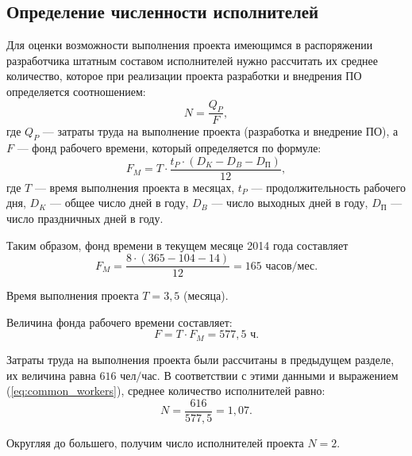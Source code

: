 \subsection{Определение численности исполнителей} \label{workers}

Для оценки возможности выполнения проекта имеющимся в распоряжении разработчика штатным составом исполнителей нужно рассчитать их среднее количество, которое при реализации проекта разработки и внедрения ПО определяется соотношением:
\begin{equation}
  \label{eq:common_workers}
N = \frac {Q_P} {F},
\end{equation}
где $Q_P$ --- затраты труда на выполнение проекта (разработка и внедрение ПО), а $F$ --- фонд рабочего времени, который определяется по формуле:
\begin{equation}
  \label{eq:time_fund_month_common}
F_M = T \cdot \frac {t_P \cdot (D_K - D_B - D_\textrm{П})} {12},
\end{equation}
где $T$ --- время выполнения проекта в месяцах, $t_P$ --- продолжительность рабочего дня, $D_K$ --- общее число дней в году, $D_B$ --- число выходных дней в году, $D_\textrm{П}$ --- число праздничных дней в году.

\vspace{\baselineskip}
Таким образом, фонд времени в текущем месяце 2014 года составляет
\begin{equation}
  \label{eq:time_fund_month}
F_M = \frac {8 \cdot (365 - 104 - 14)} {12} = 165 \textrm{ часов/мес}.
\end{equation}

Время выполнения проекта $T = 3,5$ (месяца).

\vspace{\baselineskip}
Величина фонда рабочего времени составляет:
\begin{equation}
  \label{eq:time_fund}
F = T \cdot F_M = 577,5 \textrm{ ч}.
\end{equation}

Затраты труда на выполнения проекта были рассчитаны в предыдущем разделе, их величина равна $616 \textrm{ чел/час}$. В соответствии с этими данными и выражением (\ref{eq:common_workers}), среднее количество исполнителей равно:
\begin{equation}
  \label{eq:workers_avg}
N = \frac {616} {577,5} = 1,07.
\end{equation}

Округляя до большего, получим число исполнителей проекта $N = 2$. 